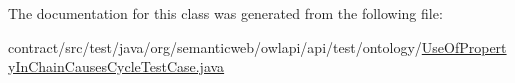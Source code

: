 The documentation for this class was generated from the following file\-:\begin{DoxyCompactItemize}
\item 
contract/src/test/java/org/semanticweb/owlapi/api/test/ontology/\hyperlink{_use_of_property_in_chain_causes_cycle_test_case_8java}{Use\-Of\-Property\-In\-Chain\-Causes\-Cycle\-Test\-Case.\-java}\end{DoxyCompactItemize}
